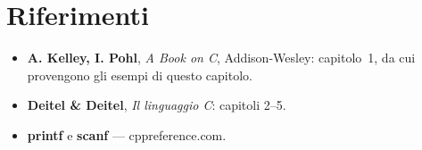 \section{Riferimenti}

\begin{itemize}
  \item \textbf{A. Kelley, I. Pohl}, \textit{A Book on C}, Addison-Wesley:
        capitolo~1, da cui provengono gli esempi di questo capitolo.
  \item \textbf{Deitel \& Deitel}, \textit{Il linguaggio C}: capitoli 2--5.
  \item \textbf{printf} e \textbf{scanf} --- cppreference.com. \\
         \\
\end{itemize}
